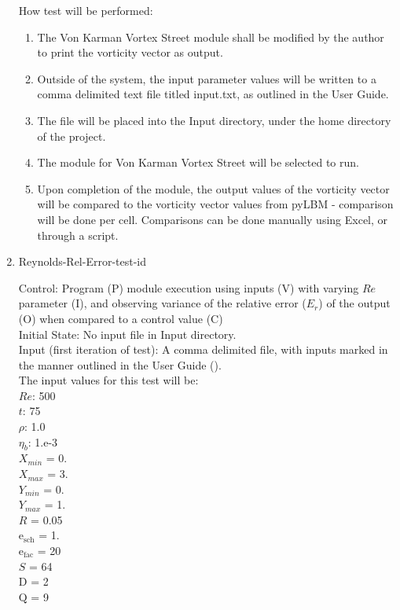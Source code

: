 \documentclass[12pt, titlepage]{article}
\newcounter{testcounter} %
\begin{document}
\begin{enumerate}
How test will be performed:

\begin{enumerate}
\item The Von Karman Vortex Street module shall be modified by the author to
  print the vorticity vector as output.
\item Outside of the system, the input parameter values will be written to a
  comma delimited text file titled input.txt, as outlined in the User Guide.
\item The file will be placed into the Input directory, under the home directory
  of the project.
\item The module for Von Karman Vortex Street will be selected to run.
\item Upon completion of the module, the output values of the vorticity vector
  will be compared to the vorticity vector values from pyLBM - comparison will
  be done per cell. Comparisons can be done manually using Excel, or through a
  script.
\end{enumerate}

\item{Reynolds-Rel-Error-test-id\thetestcounter \\}

Control: Program (P) module execution using  inputs (V) with varying $Re$
parameter (I), and observing variance of the relative error ($E_r$) of the
output (O) when compared to a control value (C) \\
					
Initial State: No input file in Input directory.\\
					
Input (first iteration of test): A comma delimited file, with inputs marked in
the manner outlined in the User Guide (\citet{LBM_UserGuide_PM}).\\The input
values for this test will be:\\
$Re$: 500\\
$t$: 75\\
$\rho$: 1.0\\
$\eta_b$: 1.e-3\\
$X_{min}$ = 0.\\
$X_{max}$ = 3.\\
$Y_{min}$ = 0.\\
$Y_{max}$ = 1.\\
$R$ = 0.05\\
$\mathrm{e_{sch}}$ = 1.\\
$\mathrm{e_{fac}}$ = 20\\
$S$ = 64\\
$\mathrm{D}$ = 2\\
$\mathrm{Q}$ = 9\\


\end{enumerate}
\end{document}
